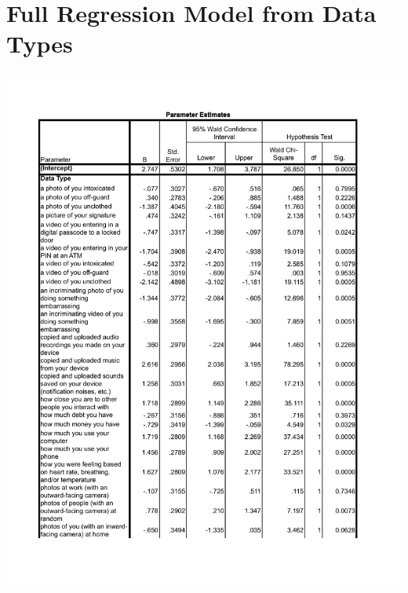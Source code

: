 \onecolumn
\section{Full Regression Model from Data Types}
\label{sec:regression-apx}
\includegraphics[page=1,scale=0.8]{images/full-model.pdf}



